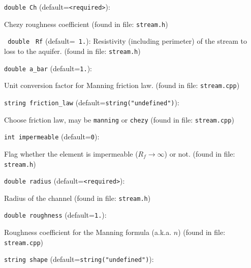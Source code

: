 \item\verb+double Ch+ {\rm(default=\verb|<required>|)}:

Chezy roughness coefficient
 (found in file: \verb+stream.h+)
\item\verb+ double+ \verb+ Rf+ {\rm(default=\verb| 1.|)}:
 Resistivity (including perimeter) of the stream to 
         loss to the aquifer. 
 (found in file: \verb+stream.h+)
\item\verb+double a_bar+ {\rm(default=\verb|1.|)}:

Unit conversion factor for Manning friction law.
 (found in file: \verb+stream.cpp+)
\item\verb+string friction_law+ {\rm(default=\verb|string("undefined")|)}:

Choose friction law, may be {\tt manning} or {\tt chezy}
 (found in file: \verb+stream.cpp+)
\item\verb+int impermeable+ {\rm(default=\verb|0|)}:

Flag whether the element is impermeable ($R_f\to\infty$) or not. 
 (found in file: \verb+stream.h+)
\item\verb+double radius+ {\rm(default=\verb|<required>|)}:

Radius of the channel
 (found in file: \verb+stream.h+)
\item\verb+double roughness+ {\rm(default=\verb|1.|)}:

Roughness coefficient for the Manning formula (a.k.a. $n$)
 (found in file: \verb+stream.cpp+)
\item\verb+string shape+ {\rm(default=\verb|string("undefined")|)}:

